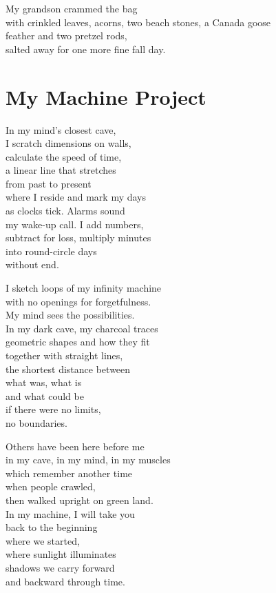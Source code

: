 \documentclass[twoside,10pt]{book}
\begin{document}
My grandson crammed the bag\\
with crinkled leaves, acorns, two beach stones, a Canada goose\\
feather and two pretzel rods,\\
salted away for one more fine fall day.


\clearpage
\section{My Machine Project}

In my mind's closest cave,\\
I scratch dimensions on walls,\\
calculate the speed of time,\\
a linear line that stretches\\
from past to present\\
where I reside and mark my days\\
as clocks tick. Alarms sound\\
my wake-up call. I add numbers,\\
subtract for loss, multiply minutes\\
into round-circle days\\
without end.

I sketch loops of my infinity machine\\
with no openings for forgetfulness.\\
My mind sees the possibilities.\\
In my dark cave, my charcoal traces\\
geometric shapes and how they fit\\
together with straight lines,\\
the shortest distance between\\
what was, what is\\
and what could be\\
if there were no limits,\\
no boundaries.

Others have been here before me\\
in my cave, in my mind, in my muscles\\
which remember another time\\
when people crawled,\\
then walked upright on green land.\\
In my machine, I will take you\\
back to the beginning\\
where we started,\\
where sunlight illuminates\\
shadows we carry forward\\
and backward through time.
\end{document}
